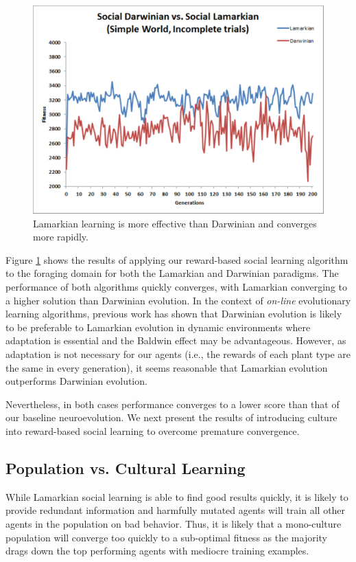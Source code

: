 \documentclass{acm_proc_article-sp}
\begin{document}
\begin{figure}
  \centering
    \includegraphics[scale=.35]{darwinian_vs_lamarkian_evolution.pdf}
  \caption{Lamarkian learning is more effective than Darwinian and converges more rapidly.}
  \label{fig:darwin-lamark}
\end{figure}


Figure \ref{fig:darwin-lamark} shows the results of applying our reward-based social learning algorithm to the foraging domain for both the Lamarkian and Darwinian paradigms. The performance of both algorithms quickly converges, with Lamarkian converging to a higher solution than Darwinian evolution. In the context of \textit{on-line} evolutionary learning algorithms, previous work \cite{whiteson2006evolutionary} has shown that Darwinian evolution is likely to be preferable to Lamarkian evolution in dynamic environments where adaptation is essential and the Baldwin effect \cite{simpson1953baldwin} may be advantageous. However, as adaptation is not necessary for our agents (i.e., the rewards of each plant type are the same in every generation), it seems reasonable that Lamarkian evolution outperforms Darwinian evolution.

Nevertheless, in both cases performance converges to a lower score than that of our baseline neuroevolution. We next present the results of introducing culture into reward-based social learning to overcome premature convergence.

\subsection*{Population vs. Cultural Learning}
While Lamarkian social learning is able to find good results quickly, it is likely to provide redundant information and harmfully mutated agents will train all other agents in the population on bad behavior. Thus, it is likely that a mono-culture population will converge too quickly to a sub-optimal fitness as the majority drags down the top performing agents with mediocre training examples.
\end{document}
